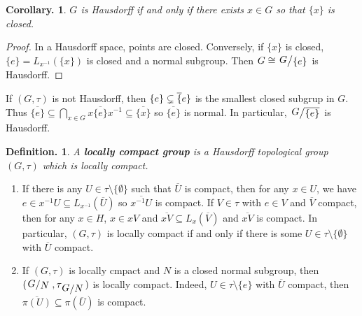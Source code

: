 \documentclass[11pt, a4paper]{memoir}
\theoremstyle{change}
\newtheorem{corollary}[theorem]{Corollary.}
\theoremstyle{plain}
\theoremstyle{nonumberplain}
\newtheorem{definition}{Definition.}
\newtheorem{proof}{Proof}
\newcommand{\quot}[2]{\mathchoice{\left.\raisebox{0.14em}{$#1$}\middle/\raisebox{-0.14em}{$#2$}\right.}
                                 {\left.\raisebox{0.08em}{$#1$}\middle/\raisebox{-0.08em}{$#2$}\right.}
                                 {\left.\raisebox{0.03em}{$#1$}\middle/\raisebox{-0.03em}{$#2$}\right.}
                                 {\left.\raisebox{0em}{$#1$}\middle/\raisebox{0em}{$#2$}\right.}}
\newcommand{\defn}[1]{{\boldmath\bfseries #1}}
\numberwithin{equation}{section}
\begin{document}
\begin{corollary}
    $G$ is Hausdorff if and only if there exists $x\in G$ so that $\{x\}$ is closed.
\end{corollary}
\begin{proof}
    In a Hausdorff space, points are closed.
    Conversely, if $\{x\}$ is closed, $\{e\}=L_{x^{-1}}(\{x\})$ is closed and a normal subgroup.
    Then $G\cong\quot{G}{\{e\}}$ is Hausdorff.
\end{proof}
If $(G,\tau)$ is not Hausdorff, then $\{e\}\subsetneq\overline\{e\}$ is the smallest closed subgrup in $G$.
Thus $\overline{\{e\}}\subseteq\bigcap_{x\in G}x\overline{\{e\}}x^{-1}\subseteq\overline{\{x\}}$ so $\overline{\{e\}}$ is normal.
In particular, $\quot{G}{\overline{\{e\}}}$ is Hausdorff.
\begin{definition}
    A \defn{locally compact group} is a Hausdorff topological group $(G,\tau)$ which is locally compact.
\end{definition}
\begin{enumerate}[nl,r]
    \item If there is any $U\in\tau\setminus\{\emptyset\}$ such that $\overline{U}$ is compact, then for any $x\in U$, we have $e\in x^{-1}U\subseteq L_{x^{-1}}(\overline{U})$ so $\overline{x^{-1}U}$ is compact.
        If $V\in\tau$ with $e\in V$ and $\overline{V}$ compact, then for any $x\in H$, $x\in xV$ and $\overline{xV}\subseteq L_x(\overline{V})$ and $\overline{xV}$ is compact.
        In particular, $(G,\tau)$ is locally compact if and only if there is some $U\in\tau\setminus\{\emptyset\}$ with $\overline{U}$ compact.
    \item If $(G,\tau)$ is locally cmpact and $N$ is a closed normal subgroup, then $(\quot{G}{N},\tau_{\quot{G}{N}})$ is locally compact.
        Indeed, $U\in\tau\setminus\{e\}$ with $\overline{U}$ compact, then $\overline{\pi(U)}\subseteq\pi(\overline{U})$ is compact.
\end{enumerate}
\end{document}
